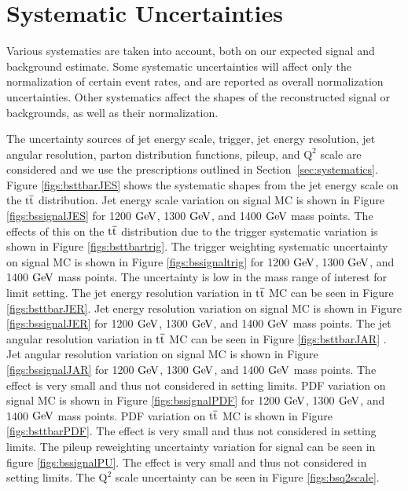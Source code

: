 \clearpage
\newpage
\chapter{Systematic Uncertainties}
\label{sec:bssystematics}
Various systematics are taken into account, both 
on our expected signal and background estimate. Some systematic uncertainties will affect only the normalization of certain event rates, 
and are reported as overall normalization uncertainties. Other systematics affect the shapes of the reconstructed signal or backgrounds, as well as their normalization.  

The uncertainty sources of jet energy scale, trigger, jet energy resolution, jet angular resolution,  parton distribution functions, pileup, and $\mathrm{Q^2}$ scale are considered 
and we use the prescriptions outlined in Section~\ref{sec:systematics}.  Figure \ref{figs:bsttbarJES} shows the systematic shapes from the 
jet energy scale on the $\mathrm{t\overline{t}}$ distribution.  Jet energy scale variation on signal MC is shown in Figure \ref{figs:bssignalJES} for 1200$~\mathrm{GeV}$,
 1300$~\mathrm{GeV}$, and 1400$~\mathrm{GeV}$ mass points.  The effects of this on the $\mathrm{t\overline{t}}$ 
distribution due to the trigger systematic variation is shown in Figure \ref{figs:bsttbartrig}. The trigger weighting systematic uncertainty on signal MC is 
shown in Figure \ref{figs:bssignaltrig} for 1200$~\mathrm{GeV}$,
 1300$~\mathrm{GeV}$, and 1400$~\mathrm{GeV}$ mass points.  The uncertainty is low in the mass range of interest for limit setting.  
The jet energy resolution variation in $\mathrm{t\overline{t}}$ MC can be seen in Figure \ref{figs:bsttbarJER}.  Jet energy resolution variation on signal MC 
is shown in Figure \ref{figs:bssignalJER} for 1200$~\mathrm{GeV}$, 1300$~\mathrm{GeV}$, and 1400$~\mathrm{GeV}$ mass points.  
The jet angular resolution variation in $\mathrm{t\overline{t}}$ MC can be seen in Figure \ref{figs:bsttbarJAR} . Jet angular resolution 
variation on signal MC is shown in Figure \ref{figs:bssignalJAR} for 1200$~\mathrm{GeV}$, 1300$~\mathrm{GeV}$, and 1400$~\mathrm{GeV}$ mass points.  
The effect is very small and thus not considered in setting limits.  PDF variation on signal MC is shown in Figure \ref{figs:bssignalPDF} for 1200$~\mathrm{GeV}$,
 1300$~\mathrm{GeV}$, and 1400$~\mathrm{GeV}$ mass points.  PDF variation on $\mathrm{t\overline{t}}$ MC is shown in Figure \ref{figs:bsttbarPDF}.  
The effect is very small and thus not considered in setting limits.  The pileup reweighting uncertainty variation for signal  
can be seen in figure \ref{figs:bssignalPU}.  The effect is very small and thus not considered in setting limits.  
The $\mathrm{Q^2}$ scale uncertainty can be seen in Figure \ref{figs:bsq2scale}.


